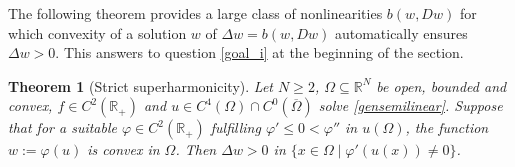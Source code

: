 \documentclass[12pt]{amsart}
\numberwithin{equation}{section}
\newtheorem{theorem}{Theorem}[section]
\theoremstyle{plain}
\theoremstyle{plain}
\theoremstyle{plain}
\theoremstyle{definition}
\newcommand{\R}{{\mathbb R}}
\renewcommand{\le}{\leqslant}
\renewcommand{\ge}{\geqslant}
\begin{document}
 The following theorem provides a large class of nonlinearities $b(w, Dw)$ for which convexity of a solution $w$ of $\Delta w=b(w, Dw)$ automatically ensures $\Delta w>0$. 
This answers to question \eqref{goal_i} at the beginning of the section.
 
 \begin{theorem}[Strict superharmonicity]
 \label{thm_lemmalappos}
 Let $N\ge 2$, $\Omega\subseteq \R^N$ be open, bounded and convex, $f\in C^2(\R_+)$ and $u\in C^4(\Omega)\cap C^0(\overline{\Omega})$ solve \eqref{gensemilinear}.
Suppose that for a suitable 
$\varphi\in C^2(\R_+)$ fulfilling $\varphi'\le 0<\varphi''$ in $u(\Omega)$, the function $w:=\varphi(u)$ is convex in $\Omega$. 
Then $\Delta w>0$ in $\{x \in \Omega \mid \varphi'(u(x))\neq 0\}$. 
 \end{theorem}
 
\end{document}
